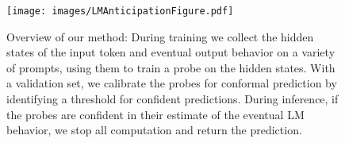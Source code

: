 \begin{figure}
    \centering
    \texttt{[image: images/LMAnticipationFigure.pdf]}
    \caption{Overview of our method: During training we collect the hidden states of the input token and eventual output behavior on a variety of prompts, using them to train a probe on the hidden states. With a validation set, we calibrate the probes for conformal prediction by identifying a threshold for confident predictions. During inference, if the probes are confident in their estimate of the eventual LM behavior, we stop all computation and return the prediction.}
    \label{fig:method}
\end{figure}